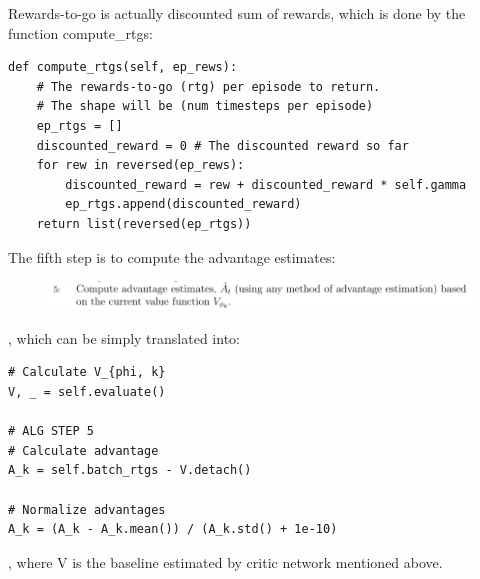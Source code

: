 \documentclass[UTF8, a4paper, 11pt]{article}
\begin{document}
Rewards-to-go is actually discounted sum of rewards, which is done by the function compute\_rtgs:
\begin{lstlisting}
def compute_rtgs(self, ep_rews):
    # The rewards-to-go (rtg) per episode to return.
    # The shape will be (num timesteps per episode)
    ep_rtgs = []
    discounted_reward = 0 # The discounted reward so far
    for rew in reversed(ep_rews):
        discounted_reward = rew + discounted_reward * self.gamma
        ep_rtgs.append(discounted_reward)
    return list(reversed(ep_rtgs))
\end{lstlisting}
The fifth step is to compute the advantage estimates:
\begin{figure}[H]
    \centering
    \includegraphics[width = \textwidth]{step5.png}
\end{figure}
, which can be simply translated into:
\begin{lstlisting}
# Calculate V_{phi, k}
V, _ = self.evaluate()

# ALG STEP 5
# Calculate advantage
A_k = self.batch_rtgs - V.detach()

# Normalize advantages
A_k = (A_k - A_k.mean()) / (A_k.std() + 1e-10)
\end{lstlisting}
, where V is the baseline estimated by critic network mentioned above.
\end{document}
